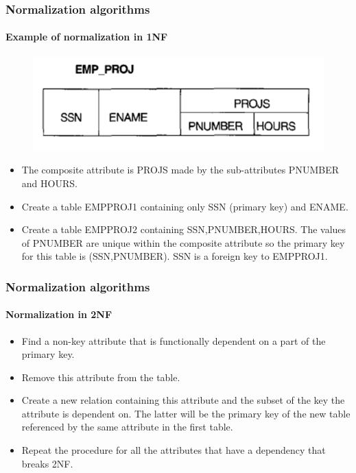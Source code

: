 \documentclass{beamer}
\begin{document}
\begin{frame}
	\frametitle{Normalization algorithms}
	\framesubtitle{Example of normalization in 1NF}
	
	\begin{figure}
		\includegraphics[scale=0.5]{img/normalization/norm14}
	\end{figure}
	
	\begin{itemize}
		\item The composite attribute is PROJS made by the sub-attributes PNUMBER and HOURS.
		\item Create a table EMP\textunderscore PROJ1 containing only SSN (primary key) and ENAME.
		\item Create a table EMP\textunderscore PROJ2 containing SSN,PNUMBER,HOURS. The values of PNUMBER are unique within the composite attribute so the primary key for this table is (SSN,PNUMBER). SSN is a foreign key to EMP\textunderscore PROJ1.	
	\end{itemize}
\end{frame}

\begin{frame}
	\frametitle{Normalization algorithms}
	\framesubtitle{Normalization in 2NF}
	
	\begin{itemize}
		\item Find a non-key attribute that is functionally dependent on a part of the primary key.
\pause
		\item Remove this attribute from the table.
		\item Create a new relation containing this attribute and the subset of the key the attribute is dependent on. The latter will be the primary key of the new table referenced by the same attribute in the first table.
\pause
		\item Repeat the procedure for all the attributes that have a dependency that breaks 2NF.		
	\end{itemize}
\end{frame}
\end{document}
